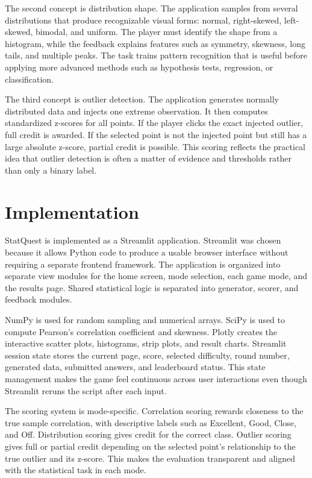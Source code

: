 \documentclass[conference]{IEEEtran}
\begin{document}
The second concept is distribution shape. The application samples from several distributions that produce recognizable visual forms: normal, right-skewed, left-skewed, bimodal, and uniform. The player must identify the shape from a histogram, while the feedback explains features such as symmetry, skewness, long tails, and multiple peaks. The task trains pattern recognition that is useful before applying more advanced methods such as hypothesis tests, regression, or classification.

The third concept is outlier detection. The application generates normally distributed data and injects one extreme observation. It then computes standardized z-scores for all points. If the player clicks the exact injected outlier, full credit is awarded. If the selected point is not the injected point but still has a large absolute z-score, partial credit is possible. This scoring reflects the practical idea that outlier detection is often a matter of evidence and thresholds rather than only a binary label.

\section{Implementation}
StatQuest is implemented as a Streamlit application. Streamlit was chosen because it allows Python code to produce a usable browser interface without requiring a separate frontend framework. The application is organized into separate view modules for the home screen, mode selection, each game mode, and the results page. Shared statistical logic is separated into generator, scorer, and feedback modules.

NumPy is used for random sampling and numerical arrays. SciPy is used to compute Pearson's correlation coefficient and skewness. Plotly creates the interactive scatter plots, histograms, strip plots, and result charts. Streamlit session state stores the current page, score, selected difficulty, round number, generated data, submitted answers, and leaderboard status. This state management makes the game feel continuous across user interactions even though Streamlit reruns the script after each input.

The scoring system is mode-specific. Correlation scoring rewards closeness to the true sample correlation, with descriptive labels such as Excellent, Good, Close, and Off. Distribution scoring gives credit for the correct class. Outlier scoring gives full or partial credit depending on the selected point's relationship to the true outlier and its z-score. This makes the evaluation transparent and aligned with the statistical task in each mode.
\end{document}
